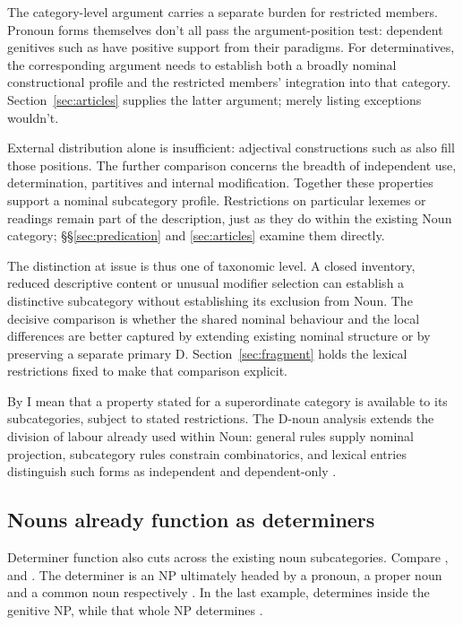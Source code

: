\documentclass[12pt]{article}
\begin{document}
The category-level argument carries a separate burden for restricted members. Pronoun forms themselves don't all pass the argument-position test: dependent genitives such as  have positive support from their paradigms. For determinatives, the corresponding argument needs to establish both a broadly nominal constructional profile and the restricted members' integration into that category. Section~\ref{sec:articles} supplies the latter argument; merely listing exceptions wouldn't.

External distribution alone is insufficient: adjectival constructions such as  also fill those positions. The further comparison concerns the breadth of independent use, determination, partitives and internal modification. Together these properties support a nominal subcategory profile. Restrictions on particular lexemes or readings remain part of the description, just as they do within the existing Noun category; §§\ref{sec:predication} and \ref{sec:articles} examine them directly.

The distinction at issue is thus one of taxonomic level. A closed inventory, reduced descriptive content or unusual modifier selection can establish a distinctive subcategory without establishing its exclusion from Noun. The decisive comparison is whether the shared nominal behaviour and the local differences are better captured by extending existing nominal structure or by preserving a separate primary D. Section~\ref{sec:fragment} holds the lexical restrictions fixed to make that comparison explicit.

By  I mean that a property stated for a superordinate category is available to its subcategories, subject to stated restrictions. The D-noun analysis extends the division of labour already used within Noun: general rules supply nominal projection, subcategory rules constrain combinatorics, and lexical entries distinguish such forms as independent  and dependent-only .

\subsection{Nouns already function as determiners}\label{sec:bridge}

Determiner function also cuts across the existing noun subcategories. Compare ,  and . The determiner is an NP ultimately headed by a pronoun, a proper noun and a common noun respectively \citep[354--355, 470--471]{huddleston2002}. In the last example,  determines  inside the genitive NP, while that whole NP determines .
\end{document}
